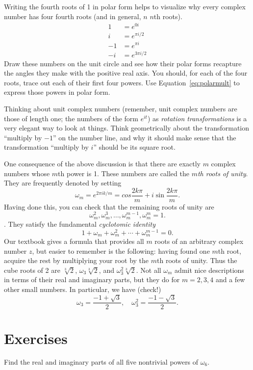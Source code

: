 \documentclass[twocolumn,12pt]{article}
\begin{document}
Writing the fourth roots of 1 in polar form helps to visualize why every complex number has four fourth roots (and in general, $n$ $n$th roots).
\begin{align*}
  1 &= e^{0i} \\
  i &= e^{\pi i/2} \\
  -1 &= e^{\pi i} \\
  -i &= e^{3\pi i/2}
\end{align*}
Draw these numbers on the unit circle and see how their polar forms recapture the angles they make with the positive real axis. You should, for each of the four roots, trace out each of their first four powers. Use Equation~\eqref{eq:polarmult} to express those powers in polar form.
%
\begin{koan}
Thinking about unit complex numbers (remember, unit complex numbers are those of length one; the numbers of the form $e^{i t}$) as \emph{rotation transformations} is a very elegant way to look at things. Think geometrically about the transformation ``multiply by $-1$'' on the number line, and why it should make sense that the transformation ``multiply by $i$'' should be its square root.
\end{koan}
%
One consequence of the above discussion is that there are exactly $m$ complex numbers whose $m$th power is 1. These numbers are called the \emph{$m$th roots of unity}. They are frequently denoted by setting
\[
  \omega_m = e^{2\pi i k/m} = cos \frac{2k \pi}{m} + i \sin \frac{2k \pi}{m}.
\]
Having done this, you can check that the remaining roots of unity are $$\omega_m^2, \omega_m^3, \ldots, \omega_m^{m-1}, \omega_m^m = 1.$$. They satisfy the fundamental \emph{cyclotomic identity}
\[
  1 + \omega_m + \omega_m^2 + \cdots + \omega_m^{m-1} = 0.
\]
Our textbook gives a formula that provides all $m$ roots of an arbitrary complex number $z$, but easier to remember is the following: having found one $m$th root, acquire the rest by multiplying your root by the $m$th roots of unity. Thus the cube roots of 2 are $\sqrt[3]{2}$, $\omega_3 \sqrt[3]{2}$, and $\omega_3^2 \sqrt[3]{2}$. Not all $\omega_m$ admit nice descriptions in terms of their real and imaginary parts, but they do for $m = 2, 3, 4$ and a few other small numbers. In particular, we have (check!)
\[
  \omega_3 = \frac{-1 + \sqrt{3}}{2}, \quad \omega^2_3 = \frac{-1 - \sqrt{3}}{2}.
\]
\section{Exercises}
\begin{exenumerate}
  \item Find the real and imaginary parts of all five nontrivial powers of $\omega_6$.
\end{exenumerate}
\end{document}
